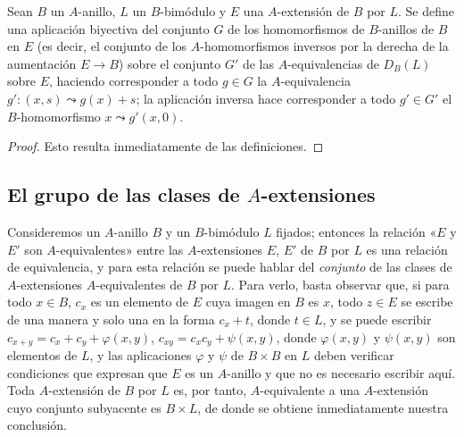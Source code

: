 \begin{proposition}[18.2.10]
\label{0.18.2.10-fr}
Sean $B$ un $A$-anillo, $L$ un $B$-bimódulo y $E$ una $A$-extensión de $B$
por $L$. Se define una aplicación biyectiva del conjunto $G$ de los
homomorfismos de $B$-anillos de $B$ en $E$ \textup{(es decir, el conjunto de los
$A$-homomorfismos inversos por la derecha de la aumentación $E\to B$)} sobre el
conjunto $G'$ de las $A$-equivalencias de $D_B(L)$ sobre $E$, haciendo
corresponder a todo $g\in G$ la $A$-equivalencia
$g':(x,s)\leadsto g(x)+s$; la aplicación inversa hace corresponder a todo
$g'\in G'$ el $B$-homomorfismo $x\leadsto g'(x,0)$.
\end{proposition}

\begin{proof}
Esto resulta inmediatamente de las definiciones.
\end{proof}

\subsection{El grupo de las clases de $A$-extensiones}
\label{subsection:0.18.3-fr}

\begin{env}[18.3.1]
\label{0.18.3.1-fr}
Consideremos un $A$-anillo $B$ y un $B$-bimódulo $L$ fijados; entonces la
relación «$E$ y $E'$ son $A$-equivalentes» entre las $A$-extensiones $E$, $E'$
de $B$ por $L$ es una relación de equivalencia, y para esta relación se puede
hablar del \emph{conjunto} de las clases de $A$-extensiones $A$-equivalentes de
$B$ por $L$. Para verlo, basta observar que, si para todo $x\in B$, $c_x$ es
un elemento de $E$ cuya imagen en $B$ es $x$, todo $z\in E$ se escribe de una
manera y solo una en la forma $c_x+t$, donde $t\in L$, y se puede escribir
$c_{x+y}=c_x+c_y+\varphi(x,y)$,
$c_{xy}=c_xc_y+\psi(x,y)$,
donde $\varphi(x,y)$ y $\psi(x,y)$ son elementos de $L$, y las aplicaciones
$\varphi$ y $\psi$ de $B\times B$ en $L$ deben verificar condiciones que
expresan que $E$ es un $A$-anillo y que no es necesario escribir aquí. Toda
$A$-extensión de $B$ por $L$ es, por tanto, $A$-equivalente a una
$A$-extensión cuyo conjunto subyacente es $B\times L$, de donde se obtiene
inmediatamente nuestra conclusión.
\end{env}

